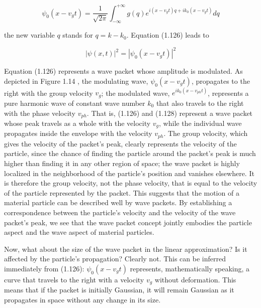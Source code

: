 \documentclass[10pt]{article}
\begin{document}
\begin{equation*}
\psi_{0}\left(x-v_{g} t\right)=\frac{1}{\sqrt{2 \pi}} \int_{-\infty}^{+\infty} g(q) e^{i\left(x-v_{g} t\right) q+i k_{0}\left(x-v_{g} t\right)} d q \tag{1.127}
\end{equation*}


the new variable $q$ stands for $q=k-k_{0}$. Equation (1.126) leads to


\begin{equation*}
|\psi(x, t)|^{2}=\left|\psi_{0}\left(x-v_{g} t\right)\right|^{2} \tag{1.128}
\end{equation*}


Equation (1.126) represents a wave packet whose amplitude is modulated. As depicted in Figure 1.14 , the modulating wave, $\psi_{0}\left(x-v_{g} t\right)$, propagates to the right with the group velocity $v_{g}$; the modulated wave, $e^{i k_{0}\left(x-v_{p h} t\right)}$, represents a pure harmonic wave of constant wave number $k_{0}$ that also travels to the right with the phase velocity $v_{p h}$. That is, (1.126) and (1.128) represent a wave packet whose peak travels as a whole with the velocity $v_{g}$, while the individual wave propagates inside the envelope with the velocity $v_{p h}$. The group velocity, which gives the velocity of the packet's peak, clearly represents the velocity of the particle, since the chance of finding the particle around the packet's peak is much higher than finding it in any other region of space; the wave packet is highly localized in the neighborhood of the particle's position and vanishes elsewhere. It is therefore the group velocity, not the phase velocity, that is equal to the velocity of the particle represented by the packet. This suggests that the motion of a material particle can be described well by wave packets. By establishing a correspondence between the particle's velocity and the velocity of the wave packet's peak, we see that the wave packet concept jointly embodies the particle aspect and the wave aspect of material particles.

Now, what about the size of the wave packet in the linear approximation? Is it affected by the particle's propagation? Clearly not. This can be inferred immediately from (1.126): $\psi_{0}\left(x-v_{g} t\right)$ represents, mathematically speaking, a curve that travels to the right with a velocity $v_{g}$ without deformation. This means that if the packet is initially Gaussian, it will remain Gaussian as it propagates in space without any change in its size.
\end{document}
